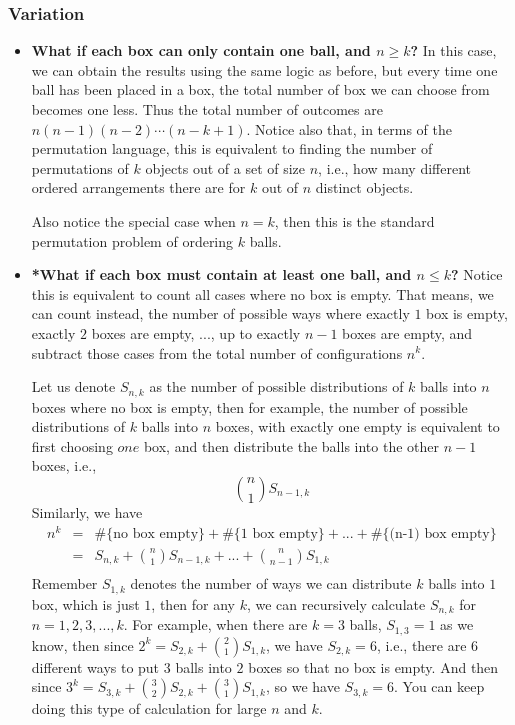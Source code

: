 \documentclass[12pt]{article}
\begin{document}
\subsubsection{Variation}
\begin{itemize}
	\item \textbf{What if each box can only contain one ball, and $n \geq k$? } In this case, we can obtain the results using the same logic as before, but every time one ball has been placed in a box, the total number of box we can choose from becomes one less. Thus the total number of outcomes are $n(n-1)(n-2)\cdots(n-k+1)$. Notice also that, in terms of the permutation language, this is equivalent to finding the number of permutations of $k$ objects out of a set of size $n$, i.e., how many different ordered arrangements there are for $k$ out of $n$ distinct objects. 

	Also notice the special case when $n=k$, then this is the standard permutation problem of ordering $k$ balls. 

	\item \textbf{*What if each box must contain at least one ball, and $n \leq k$? } Notice this is equivalent to count all cases where no box is empty. That means, we can count instead, the number of possible ways where exactly $1$ box is empty, exactly $2$ boxes are empty, ..., up to exactly $n-1$ boxes are empty, and subtract those cases from the total number of configurations $n^k$. 

	Let us denote $S_{n, k}$ as the number of possible distributions of $k$ balls into $n$ boxes where no box is empty, then for example, the number of possible distributions of $k$ balls into $n$ boxes, with exactly one empty is equivalent to first choosing $one$ box, and then distribute the balls into the other $n-1$ boxes, i.e., 
	\[
		{n \choose 1} S_{n-1, k}
	\]
	Similarly, we have
	\begin{eqnarray}\nonumber
		n^k &=& \#\{\mbox{no box empty}\} + \#\{\mbox{1 box empty}\} + ... + \#\{\mbox{(n-1) box empty}\} \\\nonumber	
			&=& S_{n, k} + {n \choose 1} S_{n-1, k} + ... + {n \choose n-1} S_{1, k} \\\nonumber
	\end{eqnarray}  
	Remember $S_{1, k}$ denotes the number of ways we can distribute $k$ balls into $1$ box, which is just $1$, then for any $k$, we can recursively calculate $S_{n, k}$ for $n = 1, 2, 3, ..., k$. For example, when there are $k=3$ balls, $S_{1, 3} = 1$ as we know, then since $2^k = S_{2, k} + {2 \choose 1} S_{1, k}$, we have $S_{2, k} = 6$, i.e., there are $6$ different ways to put $3$ balls into $2$ boxes so that no box is empty. And then since $3^k = S_{3, k} + {3 \choose 2} S_{2, k} + {3 \choose 1} S_{1, k}$, so we have $S_{3, k} = 6$. You can keep doing this type of calculation for large $n$ and $k$.

\end{itemize}
\end{document}

